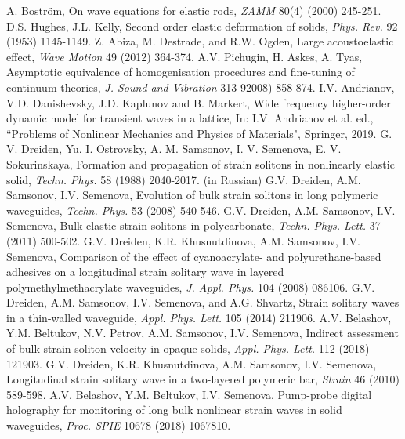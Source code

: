\documentclass[12pt, a4paper]{report}
\begin{document}
\begin{thebibliography}{99}
	 A. Bostr\"{o}m, On wave equations for elastic rods, \textit{ZAMM} 80(4) (2000) 245-251. 
	 D.S. Hughes, J.L. Kelly, Second order elastic deformation of solids, \textit{Phys. Rev.} 92 (1953) 1145-1149.
	 Z. Abiza, M. Destrade, and R.W. Ogden, Large acoustoelastic effect, \textit{Wave Motion} 49 (2012) 364-374.
	 A.V. Pichugin, H. Askes, A. Tyas, Asymptotic equivalence of homogenisation procedures and fine-tuning of continuum theories, \textit{J. Sound and Vibration} 313 92008) 858-874.
	 I.V. Andrianov, V.D. Danishevsky, J.D. Kaplunov and B. Markert, Wide frequency higher-order dynamic model for transient waves in a lattice, In: I.V. Andrianov et al. ed., ``Problems of Nonlinear Mechanics and Physics of Materials", Springer, 2019.
	 G. V. Dreiden, Yu. I. Ostrovsky, A. M. Samsonov, I. V. Semenova, E. V. Sokurinskaya, Formation and propagation of strain solitons in nonlinearly elastic solid, \textit{Techn. Phys.} 58 (1988) 2040-2017. (in Russian)
	 G.V. Dreiden, A.M. Samsonov, I.V. Semenova, Evolution of bulk strain solitons in long polymeric waveguides, \textit{Techn. Phys.} 53 (2008) 540-546.
	  G.V. Dreiden, A.M. Samsonov, I.V. Semenova, Bulk elastic strain solitons in polycarbonate, \textit{Techn. Phys. Lett.} 37 (2011) 500-502.
	 G.V. Dreiden, K.R. Khusnutdinova, A.M. Samsonov, I.V. Semenova, Comparison of the effect of cyanoacrylate- and polyurethane-based adhesives on a longitudinal strain solitary wave in layered polymethylmethacrylate waveguides, \textit{J. Appl. Phys.} 104 (2008) 086106.
	 G.V. Dreiden, A.M. Samsonov, I.V. Semenova, and A.G. Shvartz, Strain solitary waves in a thin-walled waveguide, \textit{Appl. Phys. Lett.} 105 (2014) 211906.
	 A.V. Belashov, Y.M. Beltukov, N.V. Petrov, A.M. Samsonov, I.V. Semenova, Indirect assessment of bulk strain soliton velocity in opaque solids, \textit{Appl. Phys. Lett.} 112 (2018) 121903.
	 G.V. Dreiden, K.R. Khusnutdinova, A.M. Samsonov, I.V. Semenova, Longitudinal strain solitary wave in a two-layered polymeric bar, \textit{Strain} 46 (2010) 589-598.
	 A.V. Belashov, Y.M. Beltukov, I.V. Semenova, Pump-probe digital holography for monitoring of long bulk nonlinear strain waves in solid waveguides, \textit{Proc. SPIE} 10678 (2018) 1067810.
\end{thebibliography}
\end{document}
